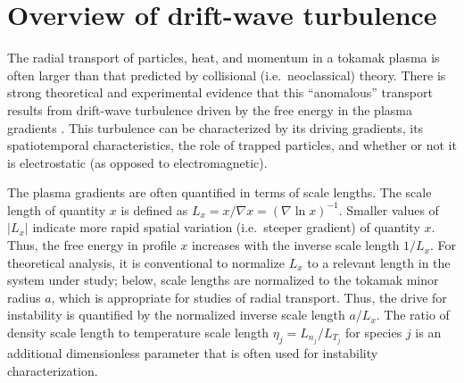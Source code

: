 \section{Overview of drift-wave turbulence}
\label{sec:TurbulenceMeasurements:Background}
The radial transport of particles, heat, and momentum in a tokamak plasma is
often larger than that predicted by collisional (i.e.\ neoclassical) theory.
There is strong theoretical and experimental evidence
that this ``anomalous'' transport
results from drift-wave turbulence
driven by the free energy in the plasma gradients
\cite{horton_drift_waves,tynan_ppcf09}.
This turbulence can be characterized by
its driving gradients,
its spatiotemporal characteristics,
the role of trapped particles, and
whether or not it is electrostatic
(as opposed to electromagnetic).

The plasma gradients are often quantified in terms of scale lengths.
The scale length of quantity $x$ is defined as
$L_x = x / \nabla x = (\nabla \ln x)^{-1}$.
Smaller values of $|L_x|$ indicate
more rapid spatial variation
(i.e.\ steeper gradient) of quantity $x$.
Thus, the free energy in profile $x$ increases with
the inverse scale length $1 / L_x$.
For theoretical analysis,
it is conventional to normalize $L_x$
to a relevant length in the system under study;
below, scale lengths are normalized
to the tokamak minor radius $a$,
which is appropriate for studies of radial transport.
Thus, the drive for instability is quantified
by the normalized inverse scale length $a / L_x$.
The ratio of density scale length to temperature scale length
$\eta_j = L_{n_j} / L_{T_j}$ for species $j$
is an additional dimensionless parameter
that is often used for instability characterization.

